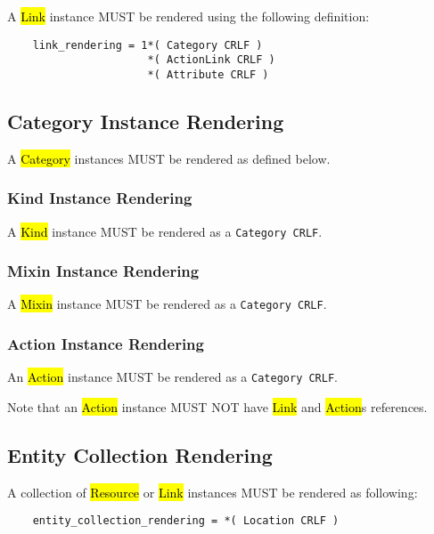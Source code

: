 \documentclass[10pt,a4paper]{article}
\begin{document}
A \hl{Link} instance MUST be rendered using the following definition:

\begin{verbatim}
	link_rendering = 1*( Category CRLF )
    	              *( ActionLink CRLF )
        	          *( Attribute CRLF )
\end{verbatim}


\subsection{Category Instance Rendering}
\label{sec:format_category_instance_rendering}

A \hl{Category} instances MUST be rendered as defined below.

\subsubsection{Kind Instance Rendering}
\label{sec:format_kind}

A \hl{Kind} instance MUST be rendered as a {\tt Category CRLF}.

\subsubsection{Mixin Instance Rendering}
\label{sec:format_mixin}

A \hl{Mixin} instance MUST be rendered as a {\tt Category CRLF}.

\subsubsection{Action Instance Rendering}
\label{sec:format_action}

An \hl{Action} instance MUST be rendered as a {\tt Category CRLF}.

Note that an \hl{Action} instance MUST NOT have \hl{Link} and \hl{Action}s references.

\subsection{Entity Collection Rendering}

A collection of \hl{Resource} or \hl{Link} instances MUST be rendered as following:

\begin{verbatim}
	entity_collection_rendering = *( Location CRLF ) 
\end{verbatim}
\end{document}

